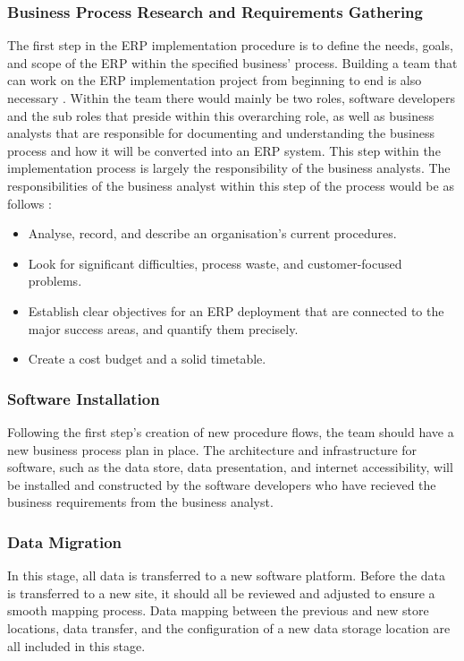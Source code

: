 \subsubsection{Business Process Research and Requirements Gathering}
\par{The first step in the ERP implementation procedure is to define the needs, goals, and scope of the ERP within the specified business' process. Building a team that can work on the ERP implementation project from beginning to end is also necessary \citep{wetherbe2006information}. Within the team there would mainly be two roles, software developers and the sub roles that preside within this overarching role, as well as business analysts that are responsible for documenting and understanding the business process and how it will be converted into an ERP system. This step within the implementation process is largely the responsibility of the business analysts. The responsibilities of the business analyst within this step of the process would be as follows \citep{yusuf2004enterprise}:}
\begin{itemize}
    \item Analyse, record, and describe an organisation's current procedures. 
    \item Look for significant difficulties, process waste, and customer-focused problems.
    \item Establish clear objectives for an ERP deployment that are connected to the major success areas, and quantify them precisely.
    \item Create a cost budget and a solid timetable.
\end{itemize}
\subsubsection{Software Installation}
\par{Following the first step's creation of new procedure flows, the team should have a new business process plan in place. The architecture and infrastructure for software, such as the data store, data presentation, and internet accessibility, will be installed and constructed by the software developers who have recieved the business requirements from the business analyst.}
\subsubsection{Data Migration}
\par{In this stage, all data is transferred to a new software platform. Before the data is transferred to a new site, it should all be reviewed and adjusted to ensure a smooth mapping process. Data mapping between the previous and new store locations, data transfer, and the configuration of a new data storage location are all included in this stage.}
